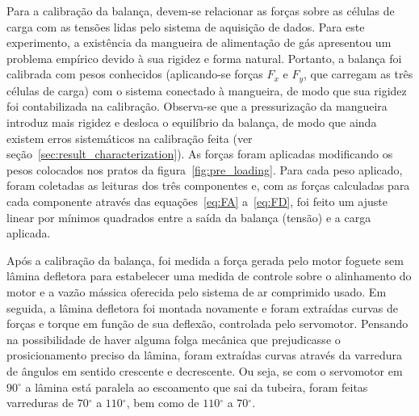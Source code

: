 Para a calibração da balança, devem-se relacionar as forças sobre as células de carga com as tensões lidas pelo sistema de aquisição de dados. Para este experimento, a existência da mangueira de alimentação de gás apresentou um problema empírico devido à sua rigidez e forma natural. Portanto, a balança foi calibrada com pesos conhecidos (aplicando-se forças \(F_x\) e \(F_y\), que carregam as três células de carga) com o sistema conectado à mangueira, de modo que sua rigidez foi contabilizada na calibração. Observa-se que a pressurização da mangueira introduz mais rigidez e desloca o equilíbrio da balança, de modo que ainda existem erros sistemáticos na calibração feita (ver seção~\ref{sec:result_characterization}). As forças foram aplicadas modificando os pesos colocados nos pratos da figura~\ref{fig:pre_loading}. Para cada peso aplicado, foram coletadas as leituras dos três componentes e, com as forças calculadas para cada componente através das equações~\ref{eq:FA} a~\ref{eq:FD}, foi feito um ajuste linear por mínimos quadrados entre a saída da balança (tensão) e a carga aplicada.

Após a calibração da balança, foi medida a força gerada pelo motor foguete sem lâmina defletora para estabelecer uma medida de controle sobre o alinhamento do motor e a vazão mássica oferecida pelo sistema de ar comprimido usado. Em seguida, a lâmina defletora foi montada novamente e foram extraídas curvas de forças e torque em função de sua deflexão, controlada pelo servomotor. Pensando na possibilidade de haver alguma folga mecânica que prejudicasse o prosicionamento preciso da lâmina, foram extraídas curvas através da varredura de ângulos em sentido crescente e decrescente. Ou seja, se com o servomotor em \(90\mathrm{^\circ}\) a lâmina está paralela ao escoamento que sai da tubeira, foram feitas varreduras de \(70\mathrm{^\circ}\) a \(110\mathrm{^\circ}\), bem como de \(110\mathrm{^\circ}\) a \(70\mathrm{^\circ}\).